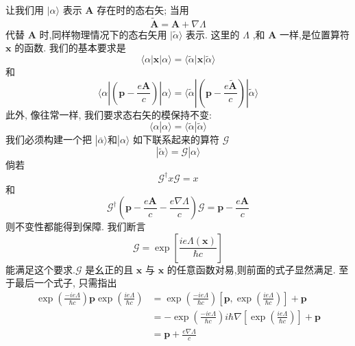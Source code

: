\documentclass[lang=cn,newtx,10pt,scheme=chinese,thmcnt=section]{elegantbook}
\begin{document}
让我们用 $|\alpha \rangle$ 表示 $\mathbf{A}$ 存在时的态右矢; 当用
\begin{equation}
	\widetilde{\mathbf{A}} = \mathbf{A} + \nabla \Lambda
\end{equation}
代替 $\mathbf{A}$ 时,同样物理情况下的态右矢用 $|\widetilde{\alpha }\rangle$ 表示. 这里的 $\Lambda$ ,和 $\mathbf{A}$ 一样,是位置算符 $\mathbf{x}$ 的函数. 我们的基本要求是
\begin{equation}
	\langle \alpha \left| \mathbf{x}\right| \alpha \rangle = \langle \widetilde{\alpha }\left| \mathbf{x}\right| \widetilde{\alpha }\rangle
\end{equation}
和
\begin{equation}
	\langle \alpha | \left( {\mathbf{p} - \frac{e\mathbf{A}}{c}}\right) | \alpha \rangle = \langle \widetilde{\alpha }| \left( {\mathbf{p} - \frac{e\widetilde{\mathbf{A}}}{c}}\right) | \widetilde{\alpha }\rangle
\end{equation}
此外, 像往常一样, 我们要求态右矢的模保持不变:
\begin{equation}
	\langle \alpha | \alpha \rangle = \langle \widetilde{\alpha } | \widetilde{\alpha }\rangle
\end{equation}
我们必须构建一个把 $\left| {\bar{\alpha }\rangle \text{和}}\right| \alpha \rangle$ 如下联系起来的算符 $\mathscr{G}$
\begin{equation}
	\left| {\widetilde{\alpha }\rangle = \mathscr{G}}\right| \alpha \rangle
\end{equation}
倘若
\begin{equation}
	\mathscr{G}^\dagger x\mathscr{G}= x
\end{equation}
和
\begin{equation}
	\mathscr{G}^\dagger\left( {\mathbf{p} - \frac{e\mathbf{A}}{c} - \frac{e\nabla \Lambda }{c}}\right) \mathscr{G} = \mathbf{p} - \frac{e\mathbf{A}}{c}
\end{equation}
则不变性都能得到保障. 我们断言
\begin{equation}
	\mathscr{G} = \exp \left\lbrack \frac{{ie\Lambda }\left( \mathbf{x}\right) }{\hbar c}\right\rbrack
\end{equation}
能满足这个要求.$\mathscr{G}$ 是幺正的且 $\mathbf{x}$ 与 $\mathbf{x}$ 的任意函数对易,则前面的式子显然满足. 至于最后一个式子, 只需指出
\begin{equation}
	\begin{aligned}
		\exp \left( \frac{-{ie\Lambda }}{\hbar c}\right) \mathbf{p}\exp \left( \frac{ie\Lambda }{\hbar c}\right) &= \exp \left( \frac{-{ie\Lambda }}{\hbar c}\right) \left\lbrack {\mathbf{p},\exp \left( \frac{ie\Lambda }{\hbar c}\right) }\right\rbrack + \mathbf{p}\\
		&= - \exp \left( \frac{-{ie\Lambda }}{\hbar c}\right) i\hbar \nabla \left\lbrack {\exp \left( \frac{ie\Lambda }{\hbar c}\right) }\right\rbrack + \mathbf{p}\\
		&= \mathbf{p} + \frac{e\nabla \Lambda }{c}
	\end{aligned}
\end{equation}
\end{document}
